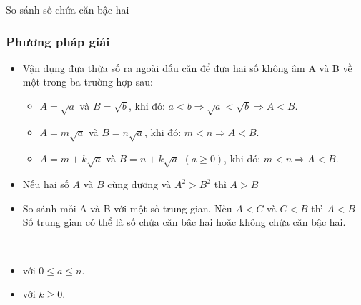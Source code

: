 	\begin{dang}{So sánh số chứa căn bậc hai }
		\subsubsection{Phương pháp giải}
		\begin{itemize}
			\item {} Vận dụng đưa thừa số ra ngoài dấu căn để đưa hai số không âm A và B về một trong ba trường hợp sau:
			\begin{itemize}
				\item $A=\sqrt{a}$ và $B=\sqrt{b}$, khi đó: $a<b \Rightarrow \sqrt{a} <\sqrt{b} \Rightarrow A<B$.
				\item $A=m\sqrt{a}$ và $B=n\sqrt{a}$, khi đó: $m<n \Rightarrow A<B$.
				\item $A=m+k\sqrt{a}$ và $B=n+k\sqrt{a}$ $(a\geq0)$, khi đó: $m<n \Rightarrow A<B$.
			\end{itemize}
			\item {} Nếu hai số $A$ và $B$ cùng dương và $A^2>B^2$ thì $A>B$
			\item {} So sánh mỗi A và B với một số trung gian.
			Nếu $A<C$ và $C<B$ thì $A<B$\\
			Số trung gian có thể là số chứa căn bậc hai hoặc không chứa căn bậc hai.
		\end{itemize}
	\\
		   \begin{itemize} 
			\item {} với $0 \leq a \leq n$.\\
			\item {} với $k \geq 0$.
			\\\\
           \end{itemize}

\end{dang}
